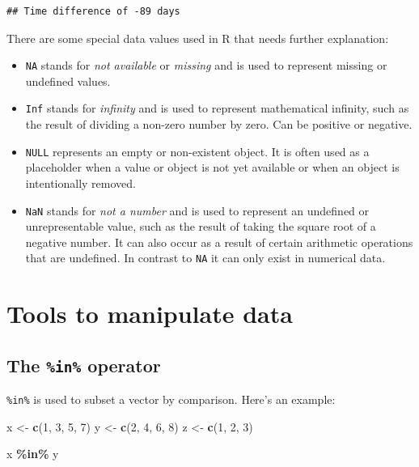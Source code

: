 \documentclass[
  12pt,
  oneside]{book}
\newenvironment{Shaded}{\begin{snugshade}}{\end{snugshade}}
\newcommand{\DecValTok}[1]{\textcolor[rgb]{0.00,0.00,0.81}{#1}}
\newcommand{\FunctionTok}[1]{\textcolor[rgb]{0.13,0.29,0.53}{\textbf{#1}}}
\newcommand{\NormalTok}[1]{#1}
\newcommand{\OtherTok}[1]{\textcolor[rgb]{0.56,0.35,0.01}{#1}}
\newcommand{\SpecialCharTok}[1]{\textcolor[rgb]{0.81,0.36,0.00}{\textbf{#1}}}
\providecommand{\tightlist}{%
  \setlength{\itemsep}{0pt}\setlength{\parskip}{0pt}}
\theoremstyle{definition}
\theoremstyle{definition}
\theoremstyle{definition}
\theoremstyle{definition}
\theoremstyle{remark}
\begin{document}
\begin{verbatim}
## Time difference of -89 days
\end{verbatim}

There are some special data values used in R that needs further explanation:

\begin{itemize}
\tightlist
\item
  \texttt{NA} stands for \emph{not available} or \emph{missing} and is used to represent missing or undefined values.
\item
  \texttt{Inf} stands for \emph{infinity} and is used to represent mathematical infinity, such as the result of dividing a non-zero number by zero. Can be positive or negative.\\
\item
  \texttt{NULL} represents an empty or non-existent object. It is often used as a placeholder when a value or object is not yet available or when an object is intentionally removed.
\item
  \texttt{NaN} stands for \emph{not a number} and is used to represent an undefined or unrepresentable value, such as the result of taking the square root of a negative number. It can also occur as a result of certain arithmetic operations that are undefined. In contrast to \texttt{NA} it can only exist in numerical data.
\end{itemize}

\hypertarget{tools-to-manipulate-data}{%
\section{Tools to manipulate data}\label{tools-to-manipulate-data}}

\hypertarget{the-in-operator}{%
\subsection{\texorpdfstring{The \texttt{\%in\%} operator}{The \%in\% operator}}\label{the-in-operator}}

\texttt{\%in\%} is used to subset a vector by comparison. Here's an example:

\begin{Shaded}
\begin{Highlighting}[]
\NormalTok{x }\OtherTok{\textless{}{-}} \FunctionTok{c}\NormalTok{(}\DecValTok{1}\NormalTok{, }\DecValTok{3}\NormalTok{, }\DecValTok{5}\NormalTok{, }\DecValTok{7}\NormalTok{)}
\NormalTok{y }\OtherTok{\textless{}{-}} \FunctionTok{c}\NormalTok{(}\DecValTok{2}\NormalTok{, }\DecValTok{4}\NormalTok{, }\DecValTok{6}\NormalTok{, }\DecValTok{8}\NormalTok{)}
\NormalTok{z }\OtherTok{\textless{}{-}} \FunctionTok{c}\NormalTok{(}\DecValTok{1}\NormalTok{, }\DecValTok{2}\NormalTok{, }\DecValTok{3}\NormalTok{)}

\NormalTok{x }\SpecialCharTok{\%in\%}\NormalTok{ y  }
\end{Highlighting}
\end{Shaded}
\end{document}
